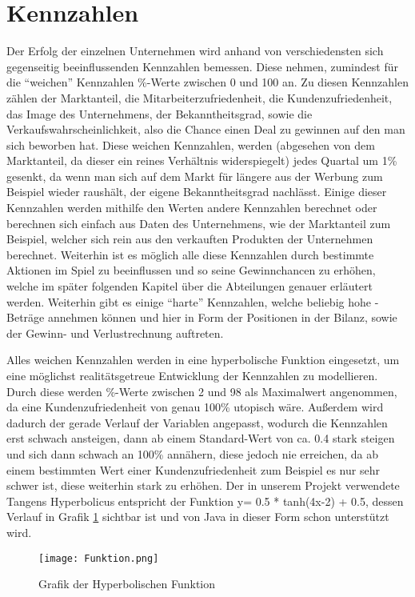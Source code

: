 \section{Kennzahlen}
Der Erfolg der einzelnen Unternehmen wird anhand von verschiedensten sich gegenseitig beeinflussenden Kennzahlen bemessen. Diese nehmen, zumindest für die \enquote{weichen} Kennzahlen \%-Werte zwischen 0 und 100 an. Zu diesen Kennzahlen zählen der Marktanteil, die Mitarbeiterzufriedenheit, die Kundenzufriedenheit, das Image des Unternehmens, der Bekanntheitsgrad, sowie die Verkaufswahrscheinlichkeit, also die Chance einen Deal zu gewinnen auf den man sich beworben hat. Diese weichen Kennzahlen, werden (abgesehen von dem Marktanteil, da dieser ein reines Verhältnis widerspiegelt) jedes Quartal um 1\% gesenkt, da wenn man sich auf dem Markt für längere aus der Werbung zum Beispiel wieder raushält, der eigene Bekanntheitsgrad nachlässt. Einige dieser Kennzahlen werden mithilfe den Werten andere Kennzahlen berechnet oder berechnen sich einfach aus Daten des Unternehmens, wie der Marktanteil zum Beispiel, welcher sich rein aus den verkauften Produkten der Unternehmen berechnet. Weiterhin ist es möglich alle diese Kennzahlen durch bestimmte Aktionen im Spiel zu beeinflussen und so seine Gewinnchancen zu erhöhen, welche im später folgenden Kapitel über die Abteilungen genauer erläutert werden. Weiterhin gibt es einige \enquote{harte} Kennzahlen, welche beliebig hohe \€-Beträge annehmen können und hier in Form der Positionen in der Bilanz, sowie der Gewinn- und Verlustrechnung auftreten.

Alles weichen Kennzahlen werden in eine hyperbolische Funktion eingesetzt, um eine möglichst realitätsgetreue Entwicklung der Kennzahlen zu modellieren. Durch diese werden \%-Werte zwischen 2 und 98 als Maximalwert angenommen, da eine Kundenzufriedenheit von genau 100\% utopisch wäre. Außerdem wird dadurch der gerade Verlauf der Variablen angepasst, wodurch die Kennzahlen erst schwach ansteigen, dann ab einem Standard-Wert von ca. 0.4 stark steigen und sich dann schwach an 100\% annähern, diese jedoch nie erreichen, da ab einem bestimmten Wert einer Kundenzufriedenheit zum Beispiel es nur sehr schwer ist, diese weiterhin stark zu erhöhen. Der in unserem Projekt verwendete Tangens Hyperbolicus entspricht der Funktion y= 0.5 * tanh(4x-2) + 0.5, dessen Verlauf in Grafik \ref{hyperbolic_function} sichtbar ist und von Java in dieser Form schon unterstützt wird.
\begin{figure}
	\centering
	\texttt{[image: Funktion.png]}
	\caption{Grafik der Hyperbolischen Funktion}
	\label{hyperbolic_function}
\end{figure}

